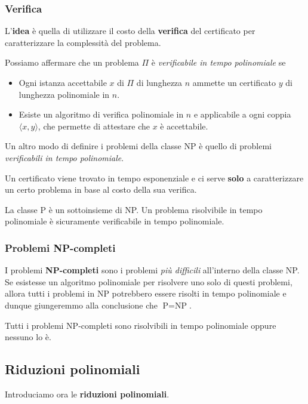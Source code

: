 \subsubsection{Verifica}
L'\textbf{idea} \`e quella di utilizzare il costo della \textbf{verifica} del certificato per caratterizzare la
complessit\`a del problema.

Possiamo affermare che un problema $\Pi$ \`e \emph{verificabile in tempo polinomiale} se
\begin{itemize}
	\item Ogni istanza accettabile $x$ di $\Pi$ di lunghezza $n$ ammette un certificato $y$ di lunghezza polinomiale
	      in $n$.
	\item Esiste un algoritmo di verifica polinomiale in $n$ e applicabile a ogni coppia $\langle x, y \rangle$, che
	      permette di attestare che $x$ \`e accettabile.
\end{itemize}
Un altro modo di definire i problemi della classe NP \`e quello di problemi \emph{verificabili in tempo polinomiale}.

\begin{observation}
	Un certificato viene trovato in tempo esponenziale e ci serve \textbf{solo} a caratterizzare un certo problema in
	base al costo della sua verifica.
\end{observation}

\begin{theorem}
	La classe P \`e un sottoinsieme di NP. Un problema risolvibile in tempo polinomiale \`e sicuramente verificabile in
	tempo polinomiale.
\end{theorem}

\subsubsection{Problemi NP-completi}
I problemi \textbf{NP-completi} sono i problemi \emph{pi\`u difficili} all'interno della classe NP. Se esistesse un
algoritmo polinomiale per risolvere uno solo di questi problemi, allora tutti i problemi in NP potrebbero essere risolti
in tempo polinomiale e dunque giungeremmo alla conclusione che $\text{P} = \text{NP}$.

\begin{theorem}
	Tutti i problemi NP-completi sono risolvibili in tempo polinomiale oppure nessuno lo \`e.
\end{theorem}

\subsection{Riduzioni polinomiali}
Introduciamo ora le \textbf{riduzioni polinomiali}.

